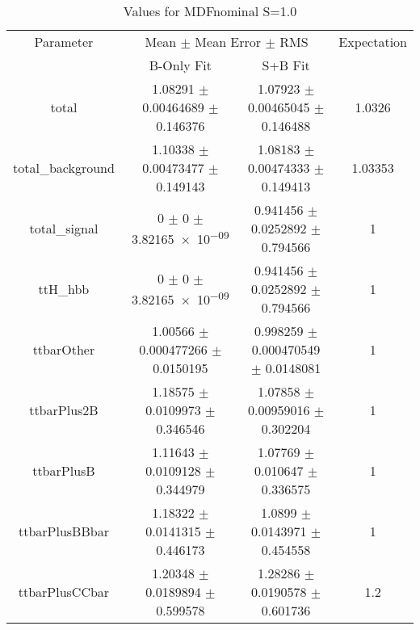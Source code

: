 \begin{table}
\centering
\caption{Values for MDFnominal S=1.0}
\begin{tabular}{cccc}
\toprule
Parameter & \multicolumn{2}{c}{Mean $\pm$ Mean Error $\pm$ RMS} & Expectation\\
 & B-Only Fit & S+B Fit & \\
\midrule
total & \num{1.08291} $\pm$ \num{0.00464689} $\pm$ \num{0.146376} & \num{1.07923} $\pm$ \num{0.00465045} $\pm$ \num{0.146488} & \num{1.0326}\\
total\_background & \num{1.10338} $\pm$ \num{0.00473477} $\pm$ \num{0.149143} & \num{1.08183} $\pm$ \num{0.00474333} $\pm$ \num{0.149413} & \num{1.03353}\\
total\_signal & \num{0} $\pm$ \num{0} $\pm$ \num{3.82165e-09} & \num{0.941456} $\pm$ \num{0.0252892} $\pm$ \num{0.794566} & \num{1}\\
ttH\_hbb & \num{0} $\pm$ \num{0} $\pm$ \num{3.82165e-09} & \num{0.941456} $\pm$ \num{0.0252892} $\pm$ \num{0.794566} & \num{1}\\
ttbarOther & \num{1.00566} $\pm$ \num{0.000477266} $\pm$ \num{0.0150195} & \num{0.998259} $\pm$ \num{0.000470549} $\pm$ \num{0.0148081} & \num{1}\\
ttbarPlus2B & \num{1.18575} $\pm$ \num{0.0109973} $\pm$ \num{0.346546} & \num{1.07858} $\pm$ \num{0.00959016} $\pm$ \num{0.302204} & \num{1}\\
ttbarPlusB & \num{1.11643} $\pm$ \num{0.0109128} $\pm$ \num{0.344979} & \num{1.07769} $\pm$ \num{0.010647} $\pm$ \num{0.336575} & \num{1}\\
ttbarPlusBBbar & \num{1.18322} $\pm$ \num{0.0141315} $\pm$ \num{0.446173} & \num{1.0899} $\pm$ \num{0.0143971} $\pm$ \num{0.454558} & \num{1}\\
ttbarPlusCCbar & \num{1.20348} $\pm$ \num{0.0189894} $\pm$ \num{0.599578} & \num{1.28286} $\pm$ \num{0.0190578} $\pm$ \num{0.601736} & \num{1.2}\\
\bottomrule
\end{tabular}
\end{table}